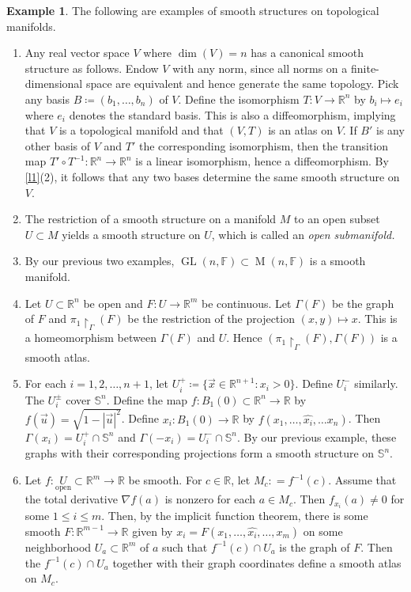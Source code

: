 \documentclass[10pt,letterpaper,cm]{nupset}
\theoremstyle{definition}
\newtheorem{exmp}[definition]{Example}
\theoremstyle{theorem}
\theoremstyle{remark}
\newcommand{\F}{\mathbb F}
\newcommand{\R}{\mathbb R}
\renewcommand{\S}{\mathbb S}
\newcommand{\1}{\mathbf{1}}
\renewcommand{\u}{\vec u}
\newcommand{\x}{\vec x}
\newcommand{\0}{\vec 0}
\DeclareMathOperator{\GL}{GL}
\DeclareMathOperator{\M}{M}
\begin{document}
\begin{exmp}{The following are examples of smooth structures on topological manifolds.}
\begin{enumerate}
\item Any real vector space $V$ where $\dim(V) = n$ has a canonical smooth structure as follows. Endow $V$ with any norm, since all norms on a finite-dimensional space are equivalent and hence generate the same topology. Pick any basis $B\coloneqq  (b_1, \ldots, b_n)$ of $V$.  Define the isomorphism  $T: V \to \R^n$ by $b_i \mapsto e_i$ where $e_i$ denotes the standard basis. This is also a diffeomorphism, implying that $V$ is a topological manifold and that $(V, T)$ is an atlas on $V$. If $B'$ is any other basis of $V$ and $T'$ the corresponding isomorphism, then the transition map $T' \circ T^{-1}: \R^n \to \R^n$ is a linear isomorphism, hence a diffeomorphism. By \cref{l1}(2), it follows that any two bases determine the same smooth structure on $V$. 
\item The restriction of a smooth structure on  a manifold $M$ to an open subset $U \subset M$ yields a smooth structure on $U$, which is called an \textit{open submanifold.} 
\item By our previous two examples, $\GL(n, \F) \subset \M(n, \F)$ is a smooth manifold.
\item Let $U\subset \R^n$ be open and $F: U \to \R^m$ be continuous. Let $\Gamma(F)$ be the graph of $F$ and $\pi_1\restriction_\Gamma(F)$ be the restriction of the projection $(x, y)\mapsto x$. This is a homeomorphism between $\Gamma(F)$ and $U$. Hence $(\pi_1 \restriction_\Gamma(F), \Gamma(F))$ is a smooth atlas.
\item For each $i = 1, 2, \ldots, n+1$, let $U_i^+ \coloneqq  \{ \x \in \R^{n+1}: x_i >0\}$. Define $U_i^-$ similarly. The $U_i^{\pm}$ cover $\S^n$. Define the map $f: B_1(0)\subset \R^n \to \R$ by $f(\u) = \sqrt{1 - |\u|^2}$. Define $x_i: B_1(0) \to \R$ by $f(x_1, \ldots, \widehat{x_i}, \ldots x_n)$.  Then $\Gamma(x_i) = U_i^+ \cap \S^n$ and $\Gamma(-x_i) = U_i^- \cap \S^n$. By our previous example, these graphs with their corresponding projections form a smooth structure on $\S^n$.
\item Let $f: \underset{\text{open}}U\subset \R^m \to \R$ be smooth. For $c \in \R$, let $M_c: = f^{-1}(c)$. Assume that the total derivative $\nabla f(a)$ is nonzero for each $a \in M_c$.  Then $f_{x_i}(a) \ne 0$ for some $1 \leq i \leq m$. Then, by the implicit function theorem, there is some smooth $F: \R^{m-1} \to \R$ given by $x_i = F(x_1, \ldots, \widehat{x_i}, \ldots, x_m)$ on some neighborhood $U_a\subset \R^m$ of $a$ such that $f^{-1}(c) \cap U_a$ is the graph of $F$.  Then the $f^{-1}(c) \cap U_a$ together with their graph coordinates define a smooth atlas on $M_c$.

\end{enumerate}
\end{exmp}
\end{document}
